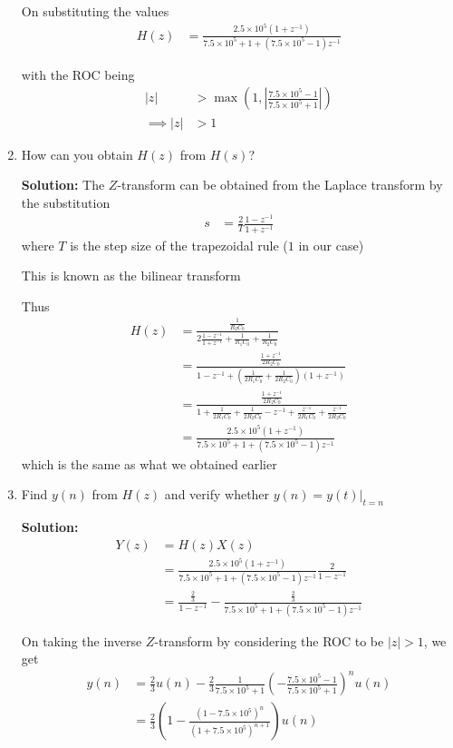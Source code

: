 \documentclass[journal,12pt,twocolumn]{IEEEtran}
\newcommand{\solution}{\noindent \textbf{Solution: }}
\providecommand{\brak}[1]{\ensuremath{\left(#1\right)}}
\providecommand{\abs}[1]{\left\vert#1\right\vert}
\numberwithin{equation}{section}
\numberwithin{figure}{section}
\renewcommand\thesection{\arabic{section}}
\begin{document}
\begin{enumerate}[label=\thesection.\arabic*.,ref=\thesection.\theenumi]
	On substituting the values
	\begin{align}
		H(z) &= \frac{2.5\times10^5 (1+z^{-1})}{7.5\times10^5 + 1 + (7.5\times10^5 - 1)z^{-1}}
	\end{align}
	
	with the ROC being
	\begin{align}
		\abs{z} &> \max\brak{1, \abs{\frac{7.5\times10^5 - 1}{7.5\times10^5 + 1}}} \\
		\implies \abs{z} &> 1
	\end{align}
	
	\item How can you obtain $H(z)$ from $H(s)$?
	
	\solution The $Z$-transform can be obtained from the Laplace transform by the substitution
	\begin{align}
		s &= \frac{2}{T} \frac{1-z^{-1}}{1+z^{-1}}
	\end{align}
	where $T$ is the step size of the trapezoidal rule ($1$ in our case)
	
	This is known as the bilinear transform
	
	Thus
	\begin{align}
		H(z) &= \frac{\frac{1}{R_2C_0}}{2\frac{1-z^{-1}}{1+z^{-1}} + \frac{1}{R_1C_0} + \frac{1}{R_2C_0}} \\
		&= \frac{\frac{1 + z^{-1}}{2R_2C_0}}{1-z^{-1}	 + \brak{\frac{1}{2R_1C_0} + \frac{1}{2R_2C_0}}(1 + z^{-1})} \\
		&= \frac{\frac{1 + z^{-1}}{2R_2C_0}}{1 + \frac{1}{2R_1C_0} + \frac{1}{2R_2C_0} - z^{-1} + \frac{z^{-1}}{2R_1C_0} + \frac{z^{-1}}{2R_2C_0}} \\
		&= \frac{2.5\times10^5 (1+z^{-1})}{7.5\times10^5 + 1 + (7.5\times10^5 - 1)z^{-1}}
	\end{align}
	which is the same as what we obtained earlier
	
	\item Find $y(n)$ from $H(z)$ and verify whether $y(n) = y(t)|_{t=n}$
	
	\solution 
	\begin{align}
		Y(z) &= H(z)X(z) \\
		&= \frac{2.5\times10^5 (1+z^{-1})}{7.5\times10^5 + 1 + (7.5\times10^5 - 1)z^{-1}} \frac{2}{1-z^{-1}} \\
		&= \frac{\frac{2}{3}}{1-z^{-1}} -\frac{\frac{2}{3}}{7.5\times10^5 + 1 + (7.5\times10^5 - 1)z^{-1}}
	\end{align}
	
	On taking the inverse $Z$-transform by considering the ROC to be $\abs{z} > 1$, we get
	\begin{align}
		y(n) &= \frac{2}{3}u(n) - \frac{2}{3}\frac{1}{7.5\times10^5 + 1}\brak{-\frac{7.5\times10^5 - 1}{7.5\times10^5 + 1}}^nu(n) \\
		&= \frac{2}{3} \brak{1 - \frac{(1-7.5\times10^5)^n}{(1+7.5\times10^5)^{n+1}}}u(n)
	\end{align}
	

\end{enumerate}
\end{document}
